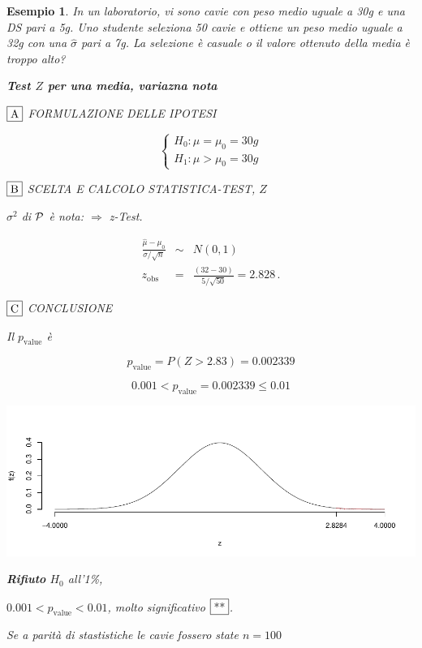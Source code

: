 \documentclass[
  11pt,
]{book}
\theoremstyle{mytheoremstyle}
\theoremstyle{mydefstyle}
\newtheorem{example}{{Esempio}}[section]
\begin{document}
\begin{example}
In un laboratorio, vi sono cavie con peso medio uguale a 30g e una DS
pari a 5g. Uno studente seleziona 50 cavie e ottiene un peso medio
uguale a 32g con una \(\hat\sigma\) pari a 7g. La selezione è casuale o il
valore ottenuto della media è troppo alto?

\textbf{Test \(Z\) per una media, variazna nota}

\(\fbox{A}\) FORMULAZIONE DELLE IPOTESI

\[\begin{cases}
   H_0: \mu = \mu_0=30g \\
   H_1: \mu > \mu_0=30g 
   \end{cases}\]

\(\fbox{B}\) SCELTA E CALCOLO STATISTICA-TEST, \(Z\)

\(\sigma^{2}\) di \(\cal{P}\) è nota: \(\Rightarrow\) z-Test.

\begin{eqnarray*}
   \frac{\hat\mu - \mu_{0}} {\sigma/\sqrt{n}}&\sim&N(0,1)\\
   z_{\text{obs}}
   &=& \frac{ ( 32 -  30 )} { 5 /\sqrt{ 50 }}
   =   2.828 \, .
   \end{eqnarray*}

\(\fbox{C}\) CONCLUSIONE

Il \(p_{\text{value}}\) è

\[ p_{\text{value}} = P(Z>2.83)=0.002339 \]

\[
 0.001 < p_\text{value}= 0.002339 \leq 0.01 
\]

\begin{center}\includegraphics{Appunti_di_Statistica_2025_files/figure-latex/unnamed-chunk-12-1} \end{center}

\textbf{Rifiuto} \(H_0\) all'1\%,

\(0.001<p_\text{value}<0.01\), \emph{molto significativo} \(\fbox{**}\).

Se a parità di stastistiche le cavie fossero state \(n=100\)


\end{example}
\end{document}
